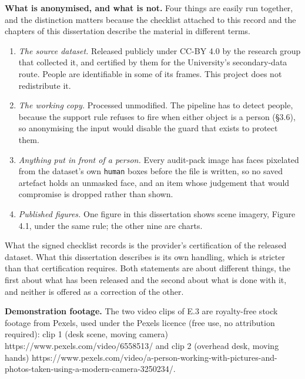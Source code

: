 \textbf{What is anonymised, and what is not.} Four things are easily run together, and the distinction matters because the checklist attached to this record and the chapters of this dissertation describe the material in different terms.

\begin{enumerate}
\item \textit{The source dataset.} Released publicly under CC-BY 4.0 by the research group that collected it, and certified by them for the University's secondary-data route. People are identifiable in some of its frames. This project does not redistribute it.
\item \textit{The working copy.} Processed unmodified. The pipeline has to detect people, because the support rule refuses to fire when either object is a person (\S{}3.6), so anonymising the input would disable the guard that exists to protect them.
\item \textit{Anything put in front of a person.} Every audit-pack image has faces pixelated from the dataset's own \texttt{human} boxes before the file is written, so no saved artefact holds an unmasked face, and an item whose judgement that would compromise is dropped rather than shown.
\item \textit{Published figures.} One figure in this dissertation shows scene imagery, Figure 4.1, under the same rule; the other nine are charts.
\end{enumerate}

What the signed checklist records is the provider's certification of the released dataset. What this dissertation describes is its own handling, which is stricter than that certification requires. Both statements are about different things, the first about what has been released and the second about what is done with it, and neither is offered as a correction of the other.

\textbf{Demonstration footage.} The two video clips of E.3 are royalty-free stock footage from Pexels, used under the Pexels licence (free use, no attribution required): clip 1 (desk scene, moving camera) https:/\allowbreak{}/\allowbreak{}www.\allowbreak{}pexels.\allowbreak{}com/\allowbreak{}video/\allowbreak{}6558513/\allowbreak{} and clip 2 (overhead desk, moving hands) https:/\allowbreak{}/\allowbreak{}www.\allowbreak{}pexels.\allowbreak{}com/\allowbreak{}video/\allowbreak{}a-\allowbreak{}person-\allowbreak{}working-\allowbreak{}with-\allowbreak{}pictures-\allowbreak{}and-\allowbreak{}photos-\allowbreak{}taken-\allowbreak{}using-\allowbreak{}a-\allowbreak{}modern-\allowbreak{}camera-\allowbreak{}3250234/\allowbreak{}.\allowbreak{}



